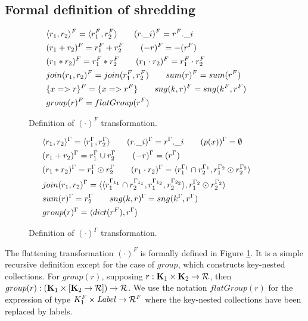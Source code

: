 {{{\subsection{Formal definition of shredding}

\begin{figure}
\begin{equation*}
\begin{aligned}
&\langle r_1, r_2 \rangle^F = \langle r_1^F, r_2^F \rangle \qquad (r.\_i)^F = r^F.\_i \\
&(r_1 + r_2)^F = r_1^F + r_2^F \qquad (-r)^F = -(r^F) \\
&(r_1*r_2)^F = r_1^F * r_2^F \qquad (r_1 \cdot r_2)^F = r_1^F \cdot r_2^F  \\
&join(r_1,r_2)^F = join(r_1^F,r_2^F) \qquad sum(r)^F = sum(r^F) \\
&\{x => r\}^F = \{x => r^F \} \qquad sng(k,r)^F = sng(k^F,r^F) \\
&group(r)^F = flatGroup(r^F) \\
\end{aligned}
\qquad
\end{equation*}
\caption{Definition of $(\cdot)^F$ transformation.}
\label{flatdef}
\end{figure}

\begin{figure}
\begin{equation*}
\begin{aligned}
&\langle r_1, r_2 \rangle^\Gamma = \langle r_1^\Gamma, r_2^\Gamma \rangle \qquad (r.\_i)^\Gamma = r^\Gamma.\_i  \qquad (p(x))^\Gamma = \emptyset \\
&(r_1 + r_2)^\Gamma = r_1^\Gamma \cup r_2^\Gamma \qquad (-r)^\Gamma = (r^\Gamma) \\
&(r_1*r_2)^\Gamma = r_1^\Gamma \odot r_2^\Gamma \qquad (r_1 \cdot r_2)^\Gamma = \langle r_1^{\Gamma_1} \cap r_2^{\Gamma_1}, r_1^{\Gamma_2} \odot r_2^{\Gamma_2} \rangle  \\
&join(r_1,r_2)^\Gamma = \langle \langle r_1^{\Gamma_{1_1}} \cap r_2^{\Gamma_{1_1}}, r_1^{\Gamma_{1_2}},r_2^{\Gamma_{2_2}} \rangle, r_1^{\Gamma_2} \odot r_2^{\Gamma_2} \rangle \\&sum(r)^\Gamma = r^\Gamma_2 \qquad sng(k,r)^\Gamma = sng(k^\Gamma,r^\Gamma) \\
&group(r)^\Gamma = \langle dict(r^F), r^\Gamma \rangle \\
\end{aligned}
\qquad
\end{equation*}
\caption{Definition of $(\cdot)^\Gamma $ transformation.}
\label{contextdef}
\end{figure}

The flattening transformation $(\cdot)^F$ is formally defined in Figure \ref{flatdef}. It is a simple recursive definition except for the case of $group$, which constructs key-nested collections. For $group(r)$, supposing $r: \mathbf{K}_1 \times \mathbf{K}_2 \rightarrow \mathcal{R}$, then $group(r): (\mathbf{K}_1 \times [\mathbf{K}_2 \rightarrow \mathcal{R}]) \rightarrow \mathcal{R}$. We use the notation $flatGroup(r)$ for the expression of type $K_1^F\times \textrm{\textit{Label}} \rightarrow \mathcal{R}^F$ where the key-nested collections have been replaced by labels.

}}}
